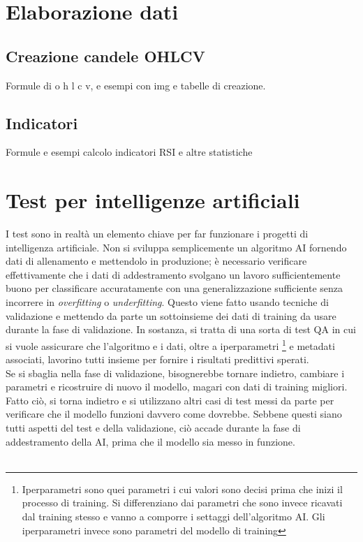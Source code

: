 \documentclass[a4paper,12pt]{report}
\begin{document}
\newpage
\chapter{Elaborazione dati}
\label{cap3}
\section{Creazione candele OHLCV}
Formule di o h l c v, e esempi con img e tabelle di creazione.
\section{Indicatori}
Formule e esempi calcolo indicatori RSI e altre statistiche

\newpage
\chapter{Test per intelligenze artificiali}	
\label{cap4}

I test sono in realtà un elemento chiave per far funzionare i progetti di intelligenza artificiale. Non si sviluppa semplicemente un algoritmo AI fornendo dati di allenamento e mettendolo in produzione; è necessario verificare effettivamente che i dati di addestramento svolgano un lavoro sufficientemente buono per classificare accuratamente con una generalizzazione sufficiente senza incorrere in \textit{overfitting} o \textit{underfitting}. Questo viene fatto usando tecniche di validazione e mettendo da parte un sottoinsieme dei dati di training da usare durante la fase di validazione. In sostanza, si tratta di una sorta di test QA in cui si vuole assicurare che l'algoritmo e i dati, oltre a iperparametri \footnote{Iperparametri sono quei parametri i cui valori sono decisi prima che inizi il processo di training. Si differenziano dai parametri che sono invece ricavati dal training stesso e vanno a comporre i settaggi dell'algoritmo AI. Gli iperparametri invece sono parametri del modello di training} e metadati associati, lavorino tutti insieme per fornire i risultati predittivi sperati.\\
Se si sbaglia nella fase di validazione, bisognerebbe tornare indietro, cambiare i parametri e ricostruire di nuovo il modello, magari con dati di training migliori. Fatto ciò, si torna indietro e si utilizzano altri casi di test messi da parte per verificare che il modello funzioni davvero come dovrebbe. Sebbene questi siano tutti aspetti del test e della validazione, ciò accade durante la fase di addestramento della AI, prima che il modello sia messo in funzione.\\~\\
\end{document}
